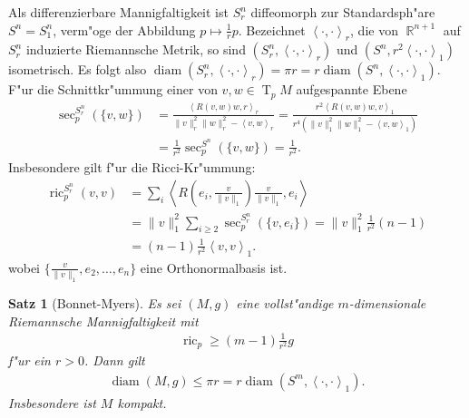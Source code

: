 \documentclass[paper=A4, twoside, chapterprefix=true, bibliography=totoc, headsepline]{scrbook}
\DeclareMathOperator{\R}{\mathbb{R}}
\DeclareMathOperator{\diam}{diam}   %
\DeclareMathOperator{\ric}{ric}     %
\DeclareMathOperator{\T}{T}         %
\theoremstyle{plain}
\newtheorem{Satz}[Dfn]{Satz}
\theoremstyle{nonumberplain}
\theoremstyle{empty}
\theoremstyle{break}
\begin{document}
Als differenzierbare Mannigfaltigkeit ist $S^n_r$ diffeomorph zur Standardsph"are $S^n = S^n_1$, verm"oge der Abbildung $p \mapsto \frac{1}{r}p$. Bezeichnet $\left<\cdot,\cdot\right>_r$, die von
$\R^{n+1}$ auf $S^n_r$ induzierte Riemannsche Metrik, so sind $(S^n_r,\left<\cdot,\cdot\right>_r)$ und $(S^n,r^2\left<\cdot,\cdot\right>_1)$ isometrisch.
Es folgt also $\diam(S^n_r,\left<\cdot,\cdot\right>_r) = \pi r = r \diam(S^n,\left<\cdot,\cdot\right>_1)$.
F"ur die Schnittkr"ummung einer von $v,w \in \T_pM$ aufgespannte Ebene
\begin{align*}
  \sec_p^{S^n_r}(\{v,w\}) & =
  \frac{\left<R(v,w)w,r\right>_r}{\|v\|_r^2\|w\|_r^2-\left<v,w\right>_r}
  =
  \frac{r^2\left<R(v,w)w,v\right>_1}{r^4(\|v\|_1^2\|w\|_1^2-\left<v,w\right>_1)}\\
  & = \frac{1}{r^2} \sec_p^{S^n}(\{v,w\}) = \frac{1}{r^2}.
\end{align*}
Insbesondere gilt f"ur die Ricci-Kr"ummung:
\begin{align*}
  \ric_p^{S_r^n}(v,v) & = \sum_i \left<R\left(e_i,\frac{v}{\|v\|_1}\right)\frac{v}{\|v\|_1},e_i\right>\\
  & = \|v\|_1^2\sum_{i \geq 2}\sec_p^{S^n_r}(\{v,e_i\}) = \|v\|_1^2 \frac{1}{r^2}(n-1)\\
  & = (n-1)\frac{1}{r^2}\left<v,v\right>_1.
\end{align*}
wobei $\{\frac{v}{\|v\|_1}, e_2, \ldots, e_n\}$ eine Orthonormalbasis ist.

\begin{Satz}[Bonnet-Myers]
  Es sei $(M,g)$ eine vollst"andige $m$-dimensionale Riemannsche Mannigfaltigkeit mit 
  \begin{align*}
    \ric_p \geq (m-1) \frac{1}{r^2} g
  \end{align*}
  f"ur ein $r > 0$.
  Dann gilt
  \begin{align*}
    \diam(M,g) \leq \pi r = r \diam(S^m,\left<\cdot,\cdot\right>_1).
  \end{align*}
  Insbesondere ist $M$ kompakt.
\end{Satz}
\end{document}
